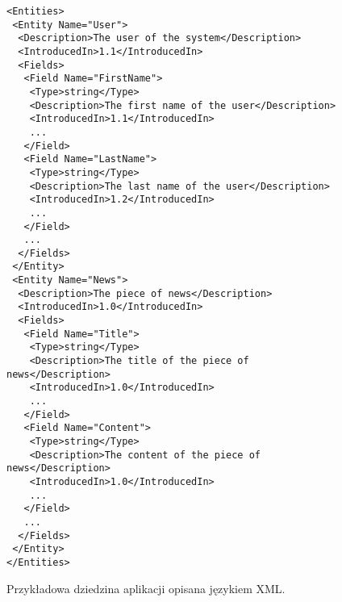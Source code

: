 \begin{figure}[!ht]
\begin{verbatim}
<Entities>
 <Entity Name="User">
  <Description>The user of the system</Description>
  <IntroducedIn>1.1</IntroducedIn>
  <Fields>
   <Field Name="FirstName">
    <Type>string</Type>
    <Description>The first name of the user</Description>
    <IntroducedIn>1.1</IntroducedIn>
    ...
   </Field>
   <Field Name="LastName">
    <Type>string</Type>
    <Description>The last name of the user</Description>
    <IntroducedIn>1.2</IntroducedIn>
    ...
   </Field>
   ...
  </Fields>
 </Entity>
 <Entity Name="News">
  <Description>The piece of news</Description>
  <IntroducedIn>1.0</IntroducedIn>
  <Fields>
   <Field Name="Title">
    <Type>string</Type>
    <Description>The title of the piece of news</Description>
    <IntroducedIn>1.0</IntroducedIn>
    ...
   </Field>
   <Field Name="Content">
    <Type>string</Type>
    <Description>The content of the piece of news</Description>
    <IntroducedIn>1.0</IntroducedIn>
    ...
   </Field>
   ...
  </Fields>
 </Entity>
</Entities>
\end{verbatim}

\caption{Przykładowa dziedzina aplikacji opisana językiem XML.}
\label{fig:implementation_core:xml}
\end{figure}
